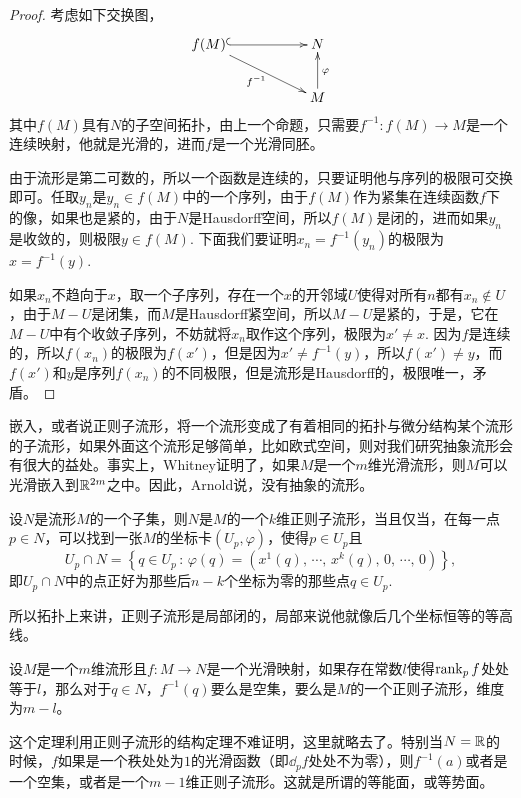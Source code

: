 \begin{proof}
	考虑如下交换图，
	\[
	\begin{xy}
		\xymatrix{
			f(M)\ar@{^{(}->}[rr]\ar[rrd]_{f^{-1}}&&N\\
			&&M\ar[u]_\varphi
		}
	\end{xy}
	\]
	其中$f(M)$具有$N$的子空间拓扑，由上一个命题，只需要$f^{-1}:f(M)\to M$是一个连续映射，他就是光滑的，进而$f$是一个光滑同胚。

	由于流形是第二可数的，所以一个函数是连续的，只要证明他与序列的极限可交换即可。任取$y_n$是$y_n\in f(M)$中的一个序列，由于$f(M)$作为紧集在连续函数$f$下的像，如果也是紧的，由于$N$是Hausdorff空间，所以$f(M)$是闭的，进而如果$y_n$是收敛的，则极限$y\in f(M)$. 下面我们要证明$x_n=f^{-1}(y_n)$的极限为$x=f^{-1}(y)$.

	如果$x_n$不趋向于$x$，取一个子序列，存在一个$x$的开邻域$U$使得对所有$n$都有$x_n\not\in U$，由于$M-U$是闭集，而$M$是Hausdorff紧空间，所以$M-U$是紧的，于是，它在$M-U$中有个收敛子序列，不妨就将$x_n$取作这个序列，极限为$x'\neq x$. 因为$f$是连续的，所以$f(x_n)$的极限为$f(x')$，但是因为$x'\neq f^{-1}(y)$，所以$f(x')\neq y$，而$f(x')$和$y$是序列$f(x_n)$的不同极限，但是流形是Hausdorff的，极限唯一，矛盾。
\end{proof}

嵌入，或者说正则子流形，将一个流形变成了有着相同的拓扑与微分结构某个流形的子流形，如果外面这个流形足够简单，比如欧式空间，则对我们研究抽象流形会有很大的益处。事实上，Whitney证明了，如果$M$是一个$m$维光滑流形，则$M$可以光滑嵌入到$\mathbb{R}^{2m}$之中。因此，Arnold说，没有抽象的流形。

\begin{thm}[正则子流形的结构定理]
设$N$是流形$M$的一个子集，则$N$是$M$的一个$k$维正则子流形，当且仅当，在每一点$p\in N$，可以找到一张$M$的坐标卡$(U_p,\varphi)$，使得$p\in U_p$且
\[
	U_p\cap N=\left\{q\in U_p\,:\,\varphi(q)=\left(x^1(q)\text{, $\cdots$, }x^k(q)\text{, }0\text{, $\cdots$, }0\right)\right\},
\]
即$U_p\cap N$中的点正好为那些后$n-k$个坐标为零的那些点$q\in U_p$. 
\end{thm}

所以拓扑上来讲，正则子流形是局部闭的，局部来说他就像后几个坐标恒等的等高线。

\begin{thm}
\label{ranktheo}设$M$是一个$m$维流形且$f:M\to N$是一个光滑映射，如果存在常数$l$使得$\operatorname{rank}_p f$处处等于$l$，那么对于$q\in N$，$f^{-1}(q)$要么是空集，要么是$M$的一个正则子流形，维度为$m-l$。
\end{thm} 

这个定理利用正则子流形的结构定理不难证明，这里就略去了。特别当$N=\mathbb{R}$的时候，$f$如果是一个秩处处为$1$的光滑函数（即$\dd_p f$处处不为零），则$f^{-1}(a)$或者是一个空集，或者是一个$m-1$维正则子流形。这就是所谓的等能面，或等势面。

